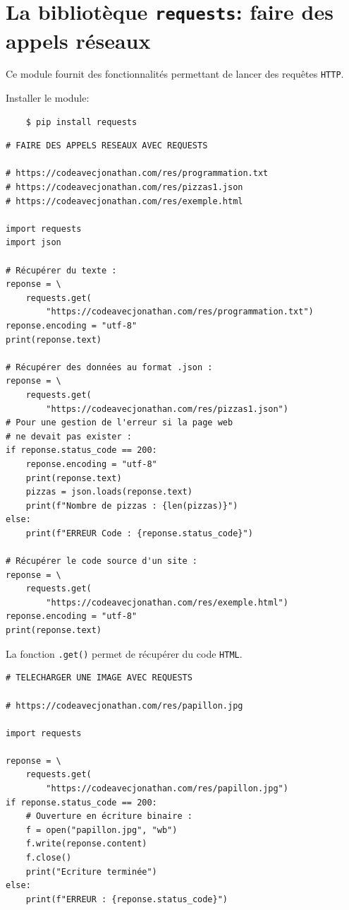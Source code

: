 \documentclass[a4paper,12pt]{book}
\begin{document}
\section{La bibliotèque \texttt{requests}: faire des appels réseaux}
Ce module fournit des fonctionnalités permettant de lancer des requêtes \texttt{HTTP}.
\medskip

Installer le module:
\begin{verbatim}
    $ pip install requests
\end{verbatim}
\medskip

\begin{lstlisting}[caption=Un premier exemple avec le module \texttt{requests}]
# FAIRE DES APPELS RESEAUX AVEC REQUESTS

# https://codeavecjonathan.com/res/programmation.txt
# https://codeavecjonathan.com/res/pizzas1.json
# https://codeavecjonathan.com/res/exemple.html

import requests
import json

# Récupérer du texte :
reponse = \ 
    requests.get(
        "https://codeavecjonathan.com/res/programmation.txt")
reponse.encoding = "utf-8"
print(reponse.text)

# Récupérer des données au format .json :
reponse = \
    requests.get(
        "https://codeavecjonathan.com/res/pizzas1.json")
# Pour une gestion de l'erreur si la page web 
# ne devait pas exister :
if reponse.status_code == 200:
    reponse.encoding = "utf-8"
    print(reponse.text)
    pizzas = json.loads(reponse.text)
    print(f"Nombre de pizzas : {len(pizzas)}")
else:
    print(f"ERREUR Code : {reponse.status_code}")

# Récupérer le code source d'un site :
reponse = \
    requests.get(
        "https://codeavecjonathan.com/res/exemple.html")
reponse.encoding = "utf-8"
print(reponse.text)
\end{lstlisting}
\medskip

La fonction \texttt{.get()} permet de récupérer du code \texttt{HTML}.
\medskip

\begin{lstlisting}[caption=Télécharger une image avec le module \texttt{requests}]
# TELECHARGER UNE IMAGE AVEC REQUESTS

# https://codeavecjonathan.com/res/papillon.jpg

import requests

reponse = \
    requests.get(
        "https://codeavecjonathan.com/res/papillon.jpg")
if reponse.status_code == 200:
    # Ouverture en écriture binaire :
    f = open("papillon.jpg", "wb")  
    f.write(reponse.content)
    f.close()
    print("Ecriture terminée")
else:
    print(f"ERREUR : {reponse.status_code}")
\end{lstlisting}
\medskip
\end{document}
